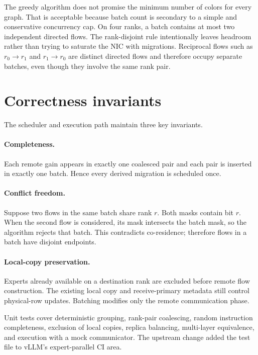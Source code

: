 The greedy algorithm does not promise the minimum number of colors for every
graph. That is acceptable because batch count is secondary to a simple and
conservative concurrency cap. On four ranks, a batch contains at most two
independent directed flows. The rank-disjoint rule intentionally leaves
headroom rather than trying to saturate the NIC with migrations. Reciprocal
flows such as $r_0\rightarrow r_1$ and $r_1\rightarrow r_0$ are distinct
directed flows and therefore occupy separate batches, even though they involve
the same rank pair.

\section{Correctness invariants}

The scheduler and execution path maintain three key invariants.

\paragraph{Completeness.}
Each remote gain appears in exactly one coalesced pair and each pair is inserted
in exactly one batch. Hence every derived migration is scheduled once.

\paragraph{Conflict freedom.}
Suppose two flows in the same batch share rank $r$. Both masks contain bit $r$.
When the second flow is considered, its mask intersects the batch mask, so the
algorithm rejects that batch. This contradicts co-residence; therefore flows in
a batch have disjoint endpoints.

\paragraph{Local-copy preservation.}
Experts already available on a destination rank are excluded before remote
flow construction. The existing local copy and receive-primary metadata still
control physical-row updates. Batching modifies only the remote communication
phase.

Unit tests cover deterministic grouping, rank-pair coalescing, random
instruction completeness, exclusion of local copies, replica balancing,
multi-layer equivalence, and execution with a mock communicator. The upstream
change added the test file to vLLM's expert-parallel CI area.

